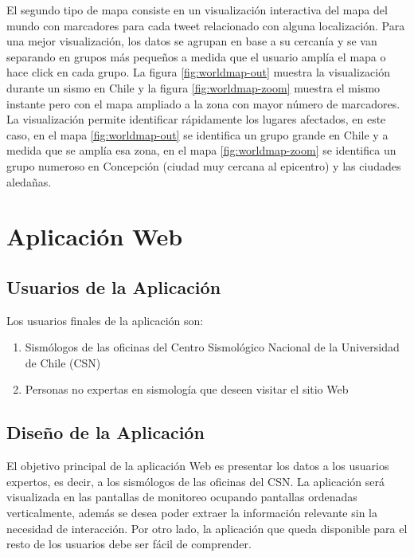 	
	El segundo tipo de mapa consiste en un visualización interactiva del mapa del mundo con marcadores para cada tweet relacionado con alguna localización.
	Para una mejor visualización, los datos se agrupan en base a su cercanía y se van separando en grupos más pequeños a medida que el usuario amplía el mapa o hace click en cada grupo. 
	La figura \ref{fig:worldmap-out} muestra la visualización durante un sismo en Chile y la figura \ref{fig:worldmap-zoom} muestra el mismo instante pero con el mapa ampliado a la zona con mayor número de marcadores.
	La visualización permite identificar rápidamente los lugares afectados, en este caso, en el mapa \ref{fig:worldmap-out} se identifica un grupo grande en Chile y a medida que se amplía esa zona, en el mapa \ref{fig:worldmap-zoom} se identifica un grupo numeroso en Concepción (ciudad muy cercana al epicentro) y las ciudades aledañas.
	
	
  	
\section{Aplicación Web}
\label{sec:aplicacion}

\subsection{Usuarios de la Aplicación}

Los usuarios finales de la aplicación son:

\begin{enumerate}
\item Sismólogos de las oficinas del Centro Sismológico Nacional de la Universidad de Chile (CSN)
\item Personas no expertas en sismología que deseen visitar el sitio Web
\end{enumerate}

\subsection{Diseño de la Aplicación}

El objetivo principal de la aplicación Web es presentar los datos a los usuarios expertos, es decir, a los sismólogos de las oficinas del CSN. 
%
La aplicación será visualizada en las pantallas de monitoreo ocupando pantallas ordenadas verticalmente, además se desea poder extraer la información relevante sin la necesidad de interacción.
%
Por otro lado, la aplicación que queda disponible para el resto de los usuarios debe ser fácil de comprender. 



